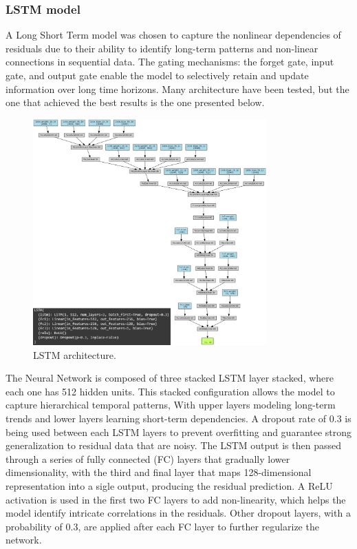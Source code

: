 \subsubsection{LSTM model}

A Long Short Term model was chosen to capture the nonlinear dependencies of residuals due to their ability to identify long-term patterns and non-linear connections in sequential data. The gating mechanisms: the forget gate, input gate, and output gate enable the model to selectively retain and update information over long time horizons. Many architecture have been tested, but the one that achieved the best results is the one presented below.
 \begin{figure}[H]
    \centering
    \includegraphics[width=0.8\textwidth]{Machine_learning_thesis/Images/LSTM architecture.png}
    \caption{LSTM architecture.} 
    \label{fig:LSTM architecture}
\end{figure}
The Neural Network is composed of three stacked LSTM layer stacked, where each one has 512 hidden units. This stacked configuration allows the model to capture hierarchical temporal patterns, With upper layers modeling long-term trends and lower layers learning short-term dependencies. A dropout rate of 0.3 is being used between each LSTM layers to prevent overfitting and guarantee strong generalization to residual data that are noisy. The LSTM output is then passed through a series of fully connected (FC) layers that gradually lower dimensionality, with the third and final layer that maps 128-dimensional representation into a sigle output, producing the residual prediction. A ReLU activation is used in the first two FC layers to add non-linearity, which helps the model identify intricate correlations in the residuals. Other dropout layers, with a probability of 0.3, are applied after each FC layer to further regularize the network. 

